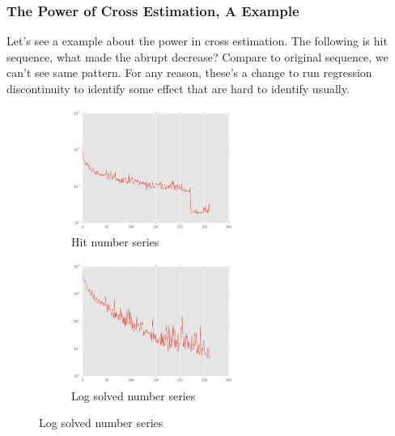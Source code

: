 \documentclass{beamer}
\begin{document}
\begin{frame}

\frametitle{The Power of Cross Estimation, A Example}

Let's see a example about the power in cross estimation. The following is hit sequence, what made the abrupt decrease?
Compare to original sequence, we can't see same pattern. For any reason, these's a change to run regression discontinuity
to identify some effect that are hard to identify usually.

\begin{figure}[h]
 
\begin{subfigure}{0.45\textwidth}
\includegraphics[width=0.9\linewidth, height=4cm]{hit-seq.png} 
\caption{Hit number series}
\label{fig:f1}
\end{subfigure}
\begin{subfigure}{0.45\textwidth}
\includegraphics[width=0.9\linewidth, height=4cm]{solved-seq2.png}
\caption{Log solved number series}
\label{fig:f2}
\end{subfigure}
 
\label{fig:image2}
\end{figure}


\end{frame}
\end{document}
